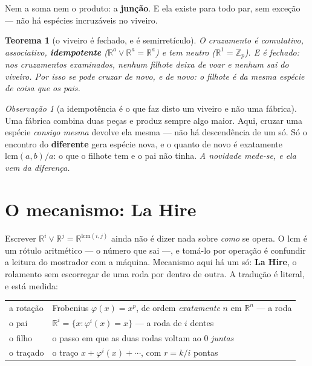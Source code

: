 \documentclass[11pt]{article}
\newcommand{\Z}{\mathbb Z}
\newcommand{\R}{\mathbb R}
\theoremstyle{plain}
\newtheorem{teorema}{Teorema}
\theoremstyle{remark}
\newtheorem{obs}{Observação}
\begin{document}
\noindent Nem a soma nem o produto: a \textbf{junção}. E ela existe para todo par, sem exceção --- não
há espécies incruzáveis no viveiro.

\begin{teorema}[o viveiro é fechado, e é semirretículo]
O cruzamento é comutativo, associativo, \textbf{idempotente} ($\R^a\vee\R^a=\R^a$) e tem neutro
($\R^1=\Z_p$). E é fechado: nos cruzamentos examinados, nenhum filhote deixa de voar e nenhum sai do
viveiro. Por isso se pode cruzar de novo, e de novo: o filhote é da mesma espécie de coisa que os
pais.
\end{teorema}

\begin{obs}[a idempotência é o que faz disto um viveiro e não uma fábrica]
Uma fábrica combina duas peças e produz sempre algo maior. Aqui, cruzar uma espécie \emph{consigo
mesma} devolve ela mesma --- não há descendência de um só. Só o encontro do \textbf{diferente} gera
espécie nova, e o quanto de novo é exatamente $\mathrm{lcm}(a,b)/a$: o que o filhote tem e o pai não
tinha. \emph{A novidade mede-se, e ela vem da diferença.}
\end{obs}

\section{O mecanismo: La Hire}

Escrever $\R^i\vee\R^j=\R^{\mathrm{lcm}(i,j)}$ ainda não é dizer nada sobre \emph{como} se opera. O
$\mathrm{lcm}$ é um rótulo aritmético --- o número que sai ---, e tomá-lo por operação é confundir a
leitura do mostrador com a máquina. Mecanismo aqui há um só: \textbf{La Hire}, o rolamento sem
escorregar de uma roda por dentro de outra. A tradução é literal, e está medida:

\begin{center}
\begin{tabular}{ll}
\toprule
a rotação & Frobenius $\varphi(x)=x^p$, de ordem \emph{exatamente} $n$ em $\R^n$ --- a roda\\
o pai & $\R^i=\{x:\varphi^i(x)=x\}$ --- a roda de $i$ dentes\\
o filho & o passo em que as duas rodas voltam ao $0$ \emph{juntas}\\
o traçado & o traço $x+\varphi^i(x)+\cdots$, com $r=k/i$ pontas\\
\bottomrule
\end{tabular}
\end{center}
\end{document}
